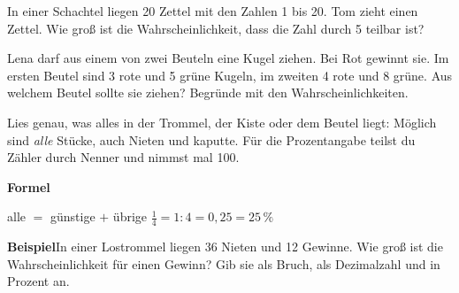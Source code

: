 \documentclass[11pt]{article}
\newcommand{\aufg}[3]{\par\noindent\makebox[0pt][r]{#3}\begin{minipage}[t]{\linewidth}#1\end{minipage}\par}
\newcommand{\nr}[1]{\makebox[7mm][l]{\textbf{#1}}}
\newlength{\kr}
\begin{document}
\medskip
\aufg{\nr{4.}In einer Schachtel liegen 20 Zettel mit den Zahlen 1 bis 20. Tom zieht einen Zettel. Wie groß ist die Wahrscheinlichkeit, dass die Zahl durch 5 teilbar ist?}{}{}
\medskip
\aufg{\nr{5.}Lena darf aus einem von zwei Beuteln eine Kugel ziehen. Bei Rot gewinnt sie. Im ersten Beutel sind 3 rote und 5 grüne Kugeln, im zweiten 4 rote und 8 grüne. Aus welchem Beutel sollte sie ziehen? Begründe mit den Wahrscheinlichkeiten.}{}{{\scriptsize\color{mbgrau}Ziel\hspace{2mm}}}
\medskip
\par\vspace{3mm}\setlength{\kr}{\dimexpr\pagegoal-\pagetotal-10mm\relax}%
\ifdim\kr>12mm\noindent{\scriptsize\color{mbgrau}Platz zum Rechnen}\par\nointerlineskip\vspace{1mm}\noindent
\begin{tikzpicture}\clip (0,0) rectangle ({\linewidth-0.5mm},\kr);\draw[black!16,line width=0.3pt,step=5mm] (0,0) grid (\linewidth,\kr);\end{tikzpicture}\fi\par
\clearpage\label{s:B}\noindent\colorbox{black!12}{}\hspace{3mm}{\Large\bfseries Alle mitzählen, in Prozent}\par\smallskip
\noindent Lies genau, was alles in der Trommel, der Kiste oder dem Beutel liegt: Möglich sind \emph{alle} Stücke, auch Nieten und kaputte. Für die Prozentangabe teilst du Zähler durch Nenner und nimmst mal 100.\par\medskip
\noindent\textbf{Formel}\par\nopagebreak\noindent\hspace*{4mm}\begin{minipage}{\dimexpr\linewidth-4mm\relax}alle $=$ günstige $+$ übrige \qquad $\frac{1}{4} = 1 : 4 = 0{,}25 = 25\,\%$\end{minipage}\par\medskip
\noindent\textbf{Beispiel}\quad In einer Lostrommel liegen 36 Nieten und 12 Gewinne. Wie groß ist die Wahrscheinlichkeit für einen Gewinn? Gib sie als Bruch, als Dezimalzahl und in Prozent an.\par\smallskip
\end{document}
